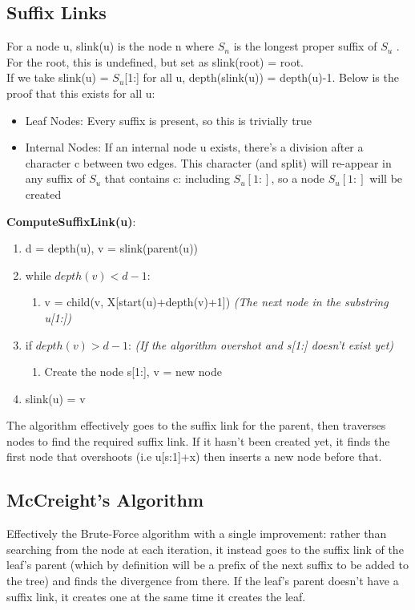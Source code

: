\subsection{Suffix Links}
For a node u, slink(u) is the node n where $S_n$ is the longest proper suffix of $S_u$ . For the root, this is undefined, but set as slink(root) = root. \\
If we take slink(u) = $S_u$[1:] for all u, depth(slink(u)) = depth(u)-1. Below is the proof that this exists for all u:

\begin{itemize}
    \item Leaf Nodes: Every suffix is present, so this is trivially true
    \item Internal Nodes: If an internal node u exists, there's a division after a character c between two edges. This character (and split) will re-appear in any suffix of $S_u$ that contains c: including $S_u[1:]$, so a node $S_u[1:]$ will be created
\end{itemize}
\newpage
\textbf{ComputeSuffixLink(u)}:
\begin{enumerate}[label=\Alph*]
    \item d = depth(u), v = slink(parent(u))
    \item while $depth(v) < d-1$:
        \begin{enumerate}
            \item [] v = child(v, X[start(u)+depth(v)+1]) \emph{(The next node in the substring u[1:])}
        \end{enumerate}     
    \item if $depth(v) > d-1$: \emph{(If the algorithm overshot and s[1:] doesn't exist yet)}
        \begin{enumerate}
            \item [] Create the node s[1:], v = new node
        \end{enumerate}     
    \item slink(u) = v    
\end{enumerate}        
The algorithm effectively goes to the suffix link for the parent, then traverses nodes to find the required suffix link. If it hasn't been created yet, it finds the first node that overshoots (i.e u[s:1]+x) then inserts a new node before that.

\subsection{McCreight's Algorithm}
Effectively the Brute-Force algorithm with a single improvement: rather than searching from the node at each iteration, it instead goes to the suffix link of the leaf's parent (which by definition will be a prefix of the next suffix to be added to the tree) and finds the divergence from there. If the leaf's parent doesn't have a suffix link, it creates one at the same time it creates the leaf.

